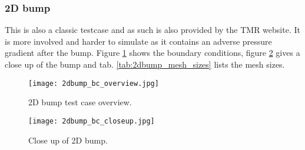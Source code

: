 



\subsubsection{2D bump}
This is also a classic testcase and as such is also provided by the TMR
website. It is more involved and harder to simulate as it contains an adverse
pressure gradient after the bump. Figure \ref{fig:2dbump_bc} shows the boundary
conditions, figure \ref{fig:2dbump_closeup} gives a close up of the bump and
tab. \ref{tab:2dbump_mesh_sizes} lists the mesh sizes.

\begin{figure}[H] \centering
    \texttt{[image: 2dbump\_bc\_overview.jpg]}
    \caption{2D bump test case overview. \cite{nasatmr}}
    \label{fig:2dbump_bc}
\end{figure}

\begin{figure}[H] \centering
    \texttt{[image: 2dbump\_bc\_closeup.jpg]}
    \caption{Close up of 2D bump. \cite{nasatmr}}
    \label{fig:2dbump_closeup}
\end{figure}


